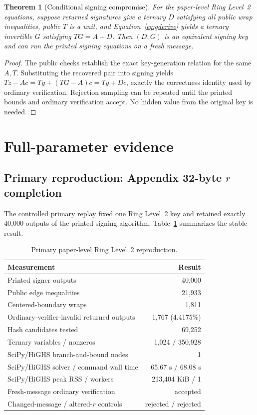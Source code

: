\documentclass[10pt,a4paper]{article}
\newtheorem{theorem}{Theorem}
\begin{document}
\begin{theorem}[Conditional signing compromise]
For the paper-level Ring Level~2 equations, suppose returned signatures give a
ternary $D$ satisfying all public wrap inequalities, public $T$ is a unit, and
Equation~\eqref{eq:gderive} yields a ternary invertible $G$ satisfying
$TG=A+D$. Then $(D,G)$ is an equivalent signing key and can run the printed
signing equations on a fresh message.
\end{theorem}
\begin{proof}
The public checks establish the exact key-generation relation for the same
$A,T$. Substituting the recovered pair into signing yields
$Tz-Ac=Ty+(TG-A)c=Ty+Dc$, exactly the correctness identity used by ordinary
verification. Rejection sampling can be repeated until the printed bounds and
ordinary verification accept. No hidden value from the original key is
needed.
\end{proof}

\section{Full-parameter evidence}
\label{sec:evidence}

\subsection{Primary reproduction: Appendix 32-byte \texorpdfstring{$r$}{r}
completion}

The controlled primary replay fixed one Ring Level~2 key and retained exactly
40,000 outputs of the printed signing algorithm. Table~\ref{tab:primary}
summarizes the stable result.

\begin{table}[ht]
\centering
\small
\begin{tabular}{@{}lr@{}}
\toprule
Measurement & Result \\
\midrule
Printed signer outputs & 40,000 \\
Public edge inequalities & 21,933 \\
Centered-boundary wraps & 1,811 \\
Ordinary-verifier-invalid returned outputs & 1,767 (4.4175\%) \\
Hash candidates tested & 69,252 \\
Ternary variables / nonzeros & 1,024 / 350,928 \\
SciPy/HiGHS branch-and-bound nodes & 1 \\
SciPy/HiGHS solver / command wall time & 65.67 s / 68.08 s \\
SciPy/HiGHS peak RSS / workers & 213,404 KiB / 1 \\
Fresh-message ordinary verification & accepted \\
Changed-message / altered-$r$ controls & rejected / rejected \\
\bottomrule
\end{tabular}
\caption{Primary paper-level Ring Level~2 reproduction.}
\label{tab:primary}
\end{table}
\end{document}
